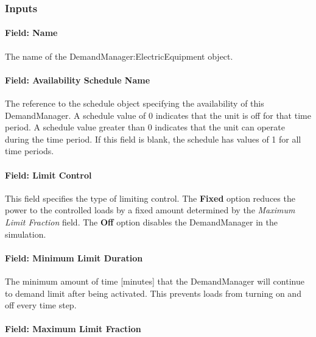 \subsubsection{Inputs}\label{inputs-3-008}

\paragraph{Field: Name}\label{field-name-3-008}

The name of the DemandManager:ElectricEquipment object.

\paragraph{Field: Availability Schedule Name}\label{field-availability-schedule-name-2-000}

The reference to the schedule object specifying the availability of this DemandManager. A schedule value of 0 indicates that the unit is off for that time period. A schedule value greater than 0 indicates that the unit can operate during the time period. If this field is blank, the schedule has values of 1 for all time periods.

\paragraph{Field: Limit Control}\label{field-limit-control-2}

This field specifies the type of limiting control. The \textbf{Fixed} option reduces the power to the controlled loads by a fixed amount determined by the \emph{Maximum Limit Fraction} field. The \textbf{Off} option disables the DemandManager in the simulation.

\paragraph{Field: Minimum Limit Duration}\label{field-minimum-limit-duration-2}

The minimum amount of time {[}minutes{]} that the DemandManager will continue to demand limit after being activated. This prevents loads from turning on and off every time step.

\paragraph{Field: Maximum Limit Fraction}\label{field-maximum-limit-fraction-2}


